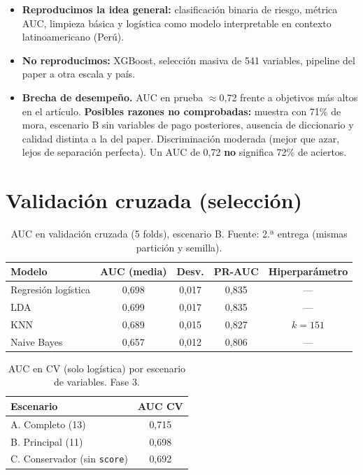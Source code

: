 \documentclass[11pt]{article}
\begin{document}
\begin{itemize}
\item \textbf{Reproducimos la idea general:} clasificación binaria de riesgo, métrica AUC, limpieza básica y logística como modelo interpretable en contexto latinoamericano (Perú).
\item \textbf{No reproducimos:} XGBoost, selección masiva de 541 variables, pipeline del paper a otra escala y país.
\item \textbf{Brecha de desempeño.} AUC en prueba $\approx$0,72 frente a objetivos más altos en el artículo. \textbf{Posibles razones no comprobadas:} muestra con 71\% de mora, escenario B sin variables de pago posteriores, ausencia de diccionario y calidad distinta a la del paper. Discriminación moderada (mejor que azar, lejos de separación perfecta). Un AUC de 0,72 \textbf{no} significa 72\% de aciertos.
\end{itemize}

\section{Validación cruzada (selección)}

\begin{table}[H]
\centering
\caption{AUC en validación cruzada (5 folds), escenario B. Fuente: 2.ª entrega (mismas partición y semilla).}
\label{tab:cv}
\small
\begin{tabular}{@{}lcccc@{}}
\toprule
\textbf{Modelo} & \textbf{AUC (media)} & \textbf{Desv.} & \textbf{PR-AUC} & \textbf{Hiperparámetro} \\
\midrule
Regresión logística & 0,698 & 0,017 & 0,835 & --- \\
LDA & 0,699 & 0,017 & 0,835 & --- \\
KNN & 0,689 & 0,015 & 0,827 & $k = 151$ \\
Naive Bayes & 0,657 & 0,012 & 0,806 & --- \\
\bottomrule
\end{tabular}
\end{table}

\begin{table}[H]
\centering
\caption{AUC en CV (solo logística) por escenario de variables. Fase 3.}
\label{tab:cvabc}
\small
\begin{tabular}{@{}lc@{}}
\toprule
\textbf{Escenario} & \textbf{AUC CV} \\
\midrule
A. Completo (13) & 0,715 \\
B. Principal (11) & 0,698 \\
C. Conservador (sin \texttt{score}) & 0,692 \\
\bottomrule
\end{tabular}
\end{table}
\end{document}
